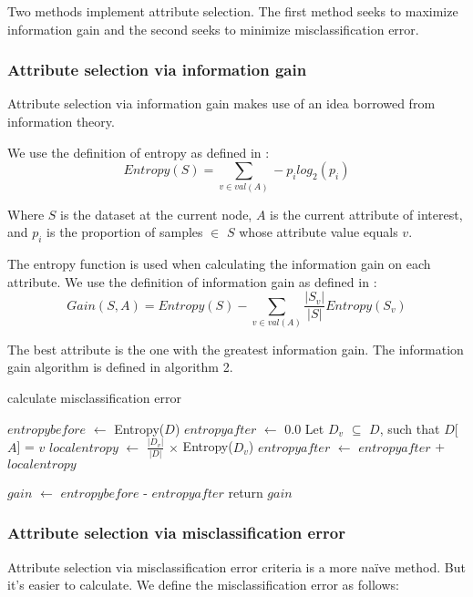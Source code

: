 \documentclass{IEEEtran}
\begin{document}
Two methods implement attribute selection. The first method seeks to
maximize information gain and the second seeks to minimize
misclassification error.

\subsubsection{Attribute selection via information gain}
Attribute selection via information gain makes use of an idea borrowed
from information theory.

We use the definition of entropy as defined
in \parencite{mitchell1997machine}:
\begin{equation}
\label{entropy-equation}
Entropy(S) = \sum_{v\in val(A)}-p_ilog_2(p_i)
\end{equation}

Where $S$ is the dataset at the current node, $A$ is the current
attribute of interest, and $p_i$ is the proportion of samples $\in$ $S$
whose attribute value equals $v$.

The entropy function is used when calculating the information gain on
each attribute. We use the definition of information gain as defined
in \parencite{mitchell1997machine}:
\begin{equation}
\label{information-gain-equation}
Gain(S,A) = Entropy(S) -\sum_{v \in val(A)}\frac{|S_v|}{|S|}Entropy(S_v)
\end{equation}

The best attribute is the one with the greatest information gain. The
information gain algorithm is defined in algorithm 2.

\begin{algorithm}
\caption{calculate misclassification error}
\begin{algorithmic}
\Statex{}
\State $entropybefore$ $\leftarrow$ Entropy($D$)
\State $entropyafter$ $\leftarrow$ 0.0
  \State Let $D_v$ $\subseteq$ $D$, such that $D$[$A$] = $v$
  \State $localentropy$ $\leftarrow$ $\frac{|D_v|}{|D|}$ $\times$ Entropy($D_v$)
  \State $entropyafter$ $\leftarrow$ $entropyafter$ + $localentropy$
\EndFor

\State $gain$ $\leftarrow$ $entropybefore$ - $entropyafter$
\State return $gain$
\end{algorithmic}
\end{algorithm}


\subsubsection{Attribute selection via misclassification error}
Attribute selection via misclassification error criteria is a more
na{\"i}ve method. But it's easier to calculate. We define the
misclassification error as follows:
\end{document}
